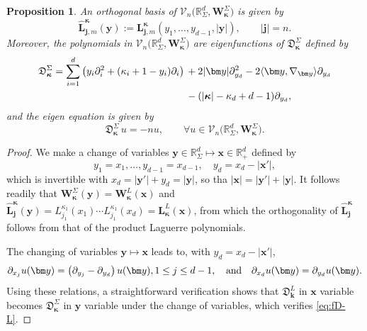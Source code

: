 \documentclass{amsart}
\newtheorem{prop}[thm]{Proposition}
\theoremstyle{remark}
\def\la{{\langle}}
\def\ra{{\rangle}}
\def\fD{{\mathfrak D}}
\def\k{{\kappa}}
\def\la{{\langle}}
\def\ra{{\rangle}}
\def\jb{{\bm j}}
\def\kb{{\bm k}}
\def\xb{{\bm x}}
\def\yb{{\bm y}}
\def\Lb{{\bm L}}
\def\Wb{{\bm W}}
\def\CV{{\mathcal V}}
\def\RR{{\mathbb R}}
\def\bk{{\boldsymbol{\kappa}}}
\begin{document}
\begin{prop} \label{prop:fD-L}
An orthogonal basis of $\CV_n\big(\RR_\Sigma^d, \Wb_\bk^\Sigma\big)$ is given by 
\begin{equation} \label{eq:basis_S}
  \hat \Lb_{\jb,m}^\bk(\yb) := %
      \Lb_{\jb,m}^\bk (y_1,\ldots, y_{d-1}, |\yb|), \qquad |\jb|= n.
\end{equation}
Moreover, the polynomials in $\CV_n\big(\RR_\Sigma^d, \Wb_\bk^\Sigma\big)$ are eigenfunctions of $\fD_\bk^\Sigma$ defined by
\begin{align}\label{eq:fDSig}
\fD_\bk^\Sigma = \sum_{i=1}^d \left(y_i \partial_i^2 + (\k_i + 1 - y_i) \partial_i \right)  \,& + 2|\yb| \partial_{y_d}^2   - 2 \la \yb, \nabla_\yb \ra \partial_{y_d}\\
  & - (|\bk|-\k_d +d-1) \partial_{y_d},\notag
\end{align} 
and the eigen equation is given by 
\begin{equation}\label{eq:fD-L}
   \fD_\bk^\Sigma \, u = - n u, \qquad \forall u \in \CV_n\big(\RR_\Sigma^d, \Wb_\bk^\Sigma\big). 
\end{equation}
\end{prop}

\begin{proof}
 We make a change of variables $\yb \in \RR_\Sigma^d \mapsto \xb \in \RR_+^d$ defined by 
 $$
        y_1 = x_1, \ldots, y_{d-1} = x_{d-1}, \quad y_d = x_d - |\xb'|,
 $$
which is invertible with $x_d = |\yb'| + y_d = |\yb|$, so tha $|\xb| = |\yb'| + |\yb|$. It follows readily that 
$\Wb_\bk^\Sigma(\yb) =  \Wb_\bk^L(\xb)$ and $\hat \Lb_\jb^\bk(\yb) = L_{j_1}^{\k_1}(x_1) \cdots L_{j_1}^{\k_1}(x_d)
= \Lb_\bk^L(\xb)$, 
from which the orthogonality of $\hat \Lb_\jb^\bk$ follows from that of the product Laguerre polynomials. 

The changing of variables $\yb \mapsto \xb$ leads to, with $y_d = x_d - |\xb'|$, 
$$
 \partial_{x_j} u(\yb) = \left(\partial_{y_j} - \partial_{y_d}\right) u(\yb), 1 \le j \le d-1, \quad \hbox{and} \quad 
  \partial_{x_d} u(\yb) = \partial_{y_d} u(\yb).
$$ 
Using these relations, a straightforward verification shows that $\fD_\kb^L$ in $\xb$ variable becomes $\fD_\bk^{\Sigma}$ in $\yb$ 
variable under the change of variables, which verifies \eqref{eq:fD-L}. 
\end{proof}
\end{document}
